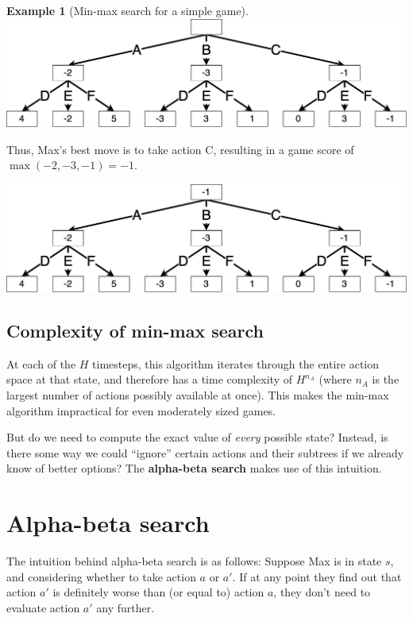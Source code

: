 \documentclass[
  letterpaper,
  DIV=11,
  numbers=noendperiod]{scrreprt}
\theoremstyle{plain}
\theoremstyle{plain}
\theoremstyle{definition}
\newtheorem{example}{Example}[chapter]
\theoremstyle{definition}
\theoremstyle{remark}
\begin{document}
\begin{example}[Min-max search for a simple
game]
\includegraphics{./shared/minmax-3.png}

Thus, Max's best move is to take action C, resulting in a game score of
\(\max(-2, -3, -1) = -1\).

\includegraphics{./shared/minmax-4.png}

\end{example}

\subsection{Complexity of min-max
search}\label{complexity-of-min-max-search}

At each of the \(H\) timesteps, this algorithm iterates through the
entire action space at that state, and therefore has a time complexity
of \(H^{n_A}\) (where \(n_A\) is the largest number of actions possibly
available at once). This makes the min-max algorithm impractical for
even moderately sized games.

But do we need to compute the exact value of \emph{every} possible
state? Instead, is there some way we could ``ignore'' certain actions
and their subtrees if we already know of better options? The
\textbf{alpha-beta search} makes use of this intuition.

\section{Alpha-beta search}\label{sec-alpha-beta-search}

The intuition behind alpha-beta search is as follows: Suppose Max is in
state \(s\), and considering whether to take action \(a\) or \(a'\). If
at any point they find out that action \(a'\) is definitely worse than
(or equal to) action \(a\), they don't need to evaluate action \(a'\)
any further.
\end{document}
